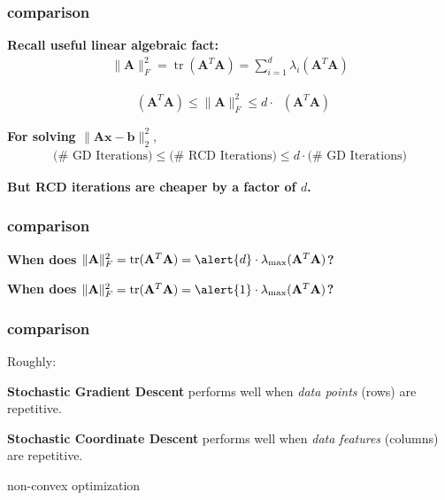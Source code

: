 \documentclass[compress]{beamer}
\newcommand{\bv}[1]{\mathbf{#1}}
\DeclareMathOperator{\tr}{tr}
\DeclareMathOperator*{\lmax}{\lambda_{max}}
\begin{document}
\begin{frame}[t]
	\frametitle{comparison}
	\textbf{Recall useful linear algebraic fact:}
	\begin{align*}
	\|\bv{A}\|_F^2 = \tr(\bv{A}^T\bv{A}) = \sum_{i=1}^d \lambda_i(\bv{A}^T\bv{A})
	\end{align*}
	
	\begin{align*}
	\lmax(\bv{A}^T\bv{A}) \leq \|\bv{A}\|_F^2 \leq d\cdot \lmax(\bv{A}^T\bv{A})
	\end{align*}
	
	\vspace{1em}
	\textbf{For solving $\|\bv{A}\bv{x} - \bv{b}\|_2^2$},
	\begin{align*}
	\text{($\#$ GD Iterations)}\leq \text{($\#$ RCD Iterations)} \leq d\cdot \text{($\#$ GD Iterations)}
	\end{align*}
	\begin{center}
		\alert{\textbf{But RCD iterations are cheaper by a factor of $d$.}}
	\end{center}
\end{frame}

\begin{frame}[t]
	\frametitle{comparison}
	\textbf{When does $\|\bv{A}\|_F^2 = \tr(\bv{A}^T\bv{A})  = \alert{d}\cdot \lmax(\bv{A}^T\bv{A})$?}
	\vspace{8em}
	
		\textbf{When does $\|\bv{A}\|_F^2 = \tr(\bv{A}^T\bv{A})  = \alert{1}\cdot \lmax(\bv{A}^T\bv{A})$?}
	
\end{frame}

\begin{frame}
	\frametitle{comparison}
	\begin{center}
		Roughly:
	\end{center}
	\textbf{Stochastic Gradient Descent} performs well when \emph{data points} (rows) are repetitive. 
	
	\vspace{1em}
	\textbf{Stochastic Coordinate Descent} performs well when \emph{data features} (columns) are repetitive. 
\end{frame}

\begin{frame}[standout]
	\begin{center}
		\large non-convex optimization
	\end{center}
\end{frame}
\end{document}
